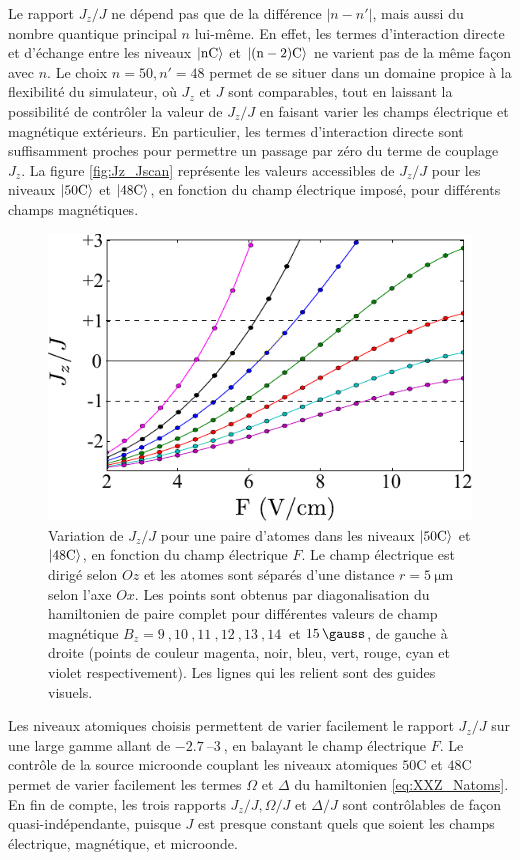 Le rapport $J_z/J$ %
ne dépend pas que de la différence $|n-n'|$, mais aussi du nombre quantique principal $n$ lui-même.
En effet, les termes d'interaction directe et d'échange entre les niveaux $\ket{\mathrm{nC}}$ et $\ket{\mathrm{(n-2)C}}$ ne varient pas de la même façon avec $n$.
Le choix $n=50,n'=48$ permet de se situer dans un domaine propice à la flexibilité du simulateur, où $J_z$ et $J$ sont comparables, tout en laissant la possibilité de contrôler la valeur de $J_z/J$ en faisant varier les champs électrique et magnétique extérieurs.
En particulier, les termes d'interaction directe sont suffisamment proches pour permettre un passage par zéro du terme de couplage $J_z$.
La figure \eqref{fig:Jz_Jscan} représente les valeurs accessibles de $J_z/J$ pour les niveaux $\ket{\mathrm{50C}}$ et $\ket{\mathrm{48C}}$, en fonction du champ électrique imposé, pour différents champs magnétiques.
%
\begin{figure}[!h]
\centering
\includegraphics[width=0.7\linewidth]{figures/circsim/Jz_Jscan}
\caption[Variation de $J_z/J$]{
Variation de $J_z/J$ pour une paire d'atomes dans les niveaux $\ket{\mathrm{50C}}$ et $\ket{\mathrm{48C}}$, en fonction du champ électrique $F$.
Le champ électrique est dirigé selon $Oz$ et les atomes sont séparés d'une distance $r=\SI{5}{\um}$ selon l'axe $Ox$.
Les points sont obtenus par diagonalisation du hamiltonien de paire complet pour différentes valeurs de champ magnétique $B_z=\SI{9}{},\SI{10}{},\SI{11}{},\SI{12}{},\SI{13}{},\SI{14}{}$ et $\SI{15}{\gauss}$, de gauche à droite (points de couleur magenta, noir, bleu, vert, rouge, cyan et violet respectivement).
Les lignes qui les relient sont des guides visuels.
}
\label{fig:Jz_Jscan}
\end{figure}
%

Les niveaux atomiques choisis permettent de varier facilement le rapport $J_z/J$ sur une large gamme allant de $\SIrange{-2.7}{+3}{}$, en balayant le champ électrique $F$.
Le contrôle de la source microonde couplant les niveaux atomiques $\mathrm{50C}$ et $\mathrm{48C}$ permet de varier facilement les termes $\Omega$ et $\Delta$ du hamiltonien \eqref{eq:XXZ_Natoms}.
En fin de compte, les trois rapports $J_z/J, \Omega/J$ et $\Delta/J$ sont contrôlables de façon quasi-indépendante, puisque $J$ est presque constant quels que soient les champs électrique, magnétique, et microonde.

